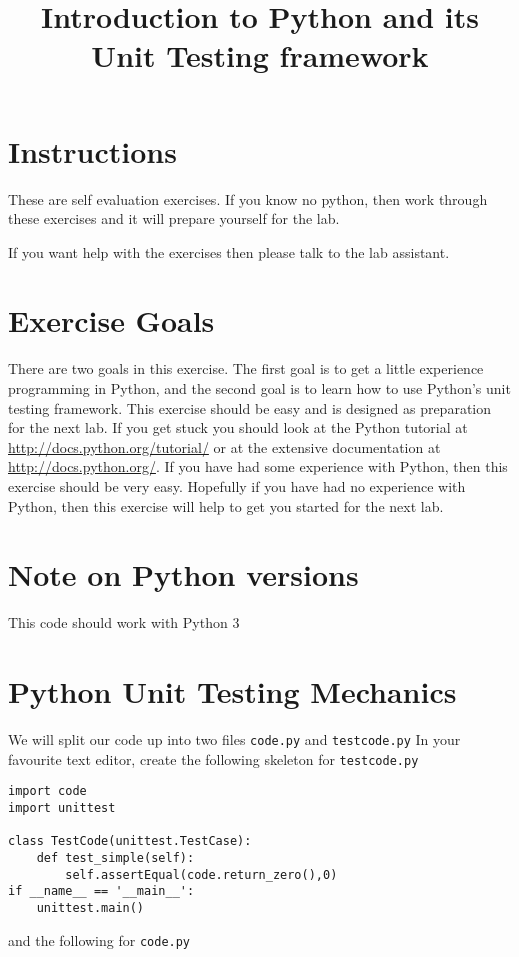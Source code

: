 \documentclass{paper}
\title{Introduction to Python and its Unit Testing framework}
\begin{document}
\maketitle
\section*{Instructions}
These are self evaluation exercises. If you know no python, then work through
these exercises and it will prepare yourself for the lab.

If you want help with the exercises then please talk to the lab
assistant.

\section*{Exercise Goals}
There are two goals in this exercise. The first goal is to get a little
experience programming in Python, and the second goal is to learn how
to use Python's unit testing framework. This exercise should be easy and is
designed as preparation for the next lab. If you get stuck you should
look at the Python tutorial at \url{http://docs.python.org/tutorial/}
or at the extensive documentation at \url{http://docs.python.org/}. If
you have had some experience with Python, then this exercise should be very
easy. Hopefully if you have had no experience with Python, then this
exercise will help to get you started for the next lab.
\section*{Note on Python versions}
This code should work with Python 3

\section*{Python Unit Testing Mechanics}
We will split our code up into two files \texttt{code.py} and
\texttt{testcode.py} In your favourite text editor, create the following
skeleton for \texttt{testcode.py}

\begin{lstlisting}
import code
import unittest

class TestCode(unittest.TestCase):
    def test_simple(self):
        self.assertEqual(code.return_zero(),0)
if __name__ == '__main__':
    unittest.main()
\end{lstlisting}

and the following for {\tt code.py}
\end{document}
